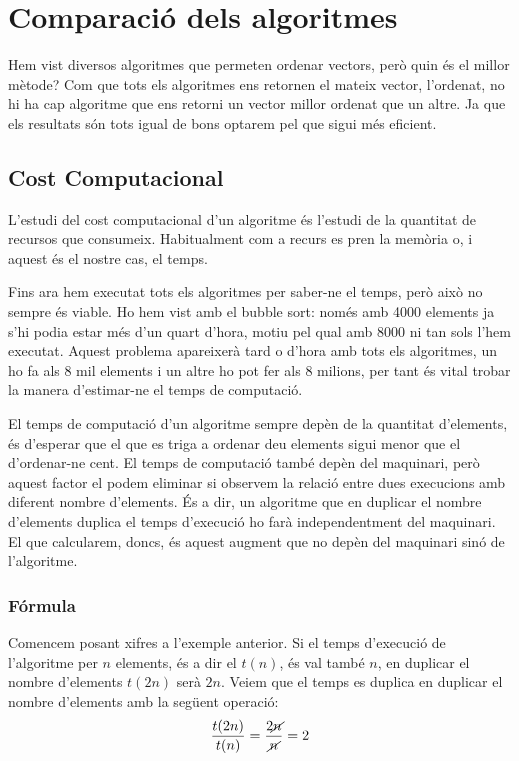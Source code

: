\chapter{Comparació dels algoritmes}
Hem vist diversos algoritmes que permeten ordenar vectors, però quin és el millor mètode?
Com que tots els algoritmes ens retornen el mateix vector, l'ordenat, no hi ha cap algoritme que ens retorni un vector millor ordenat que un altre. Ja que els resultats són tots igual de bons optarem pel que sigui més eficient.

\section{Cost Computacional}
L'estudi del cost computacional d'un algoritme és l'estudi de la quantitat de recursos que consumeix. Habitualment com a recurs es pren la memòria o, i aquest és el nostre cas, el temps.

Fins ara hem executat tots els algoritmes per saber-ne el temps, però això no sempre és viable.
Ho hem vist amb el bubble sort: només amb 4000 elements ja s'hi podia estar més d'un quart d'hora, motiu pel qual amb 8000 ni tan sols l'hem executat.
Aquest problema apareixerà tard o d'hora amb tots els algoritmes, un ho fa als 8 mil elements i un altre ho pot fer als 8 milions, per tant és vital trobar la manera d'estimar-ne el temps de computació.

El temps de computació d'un algoritme sempre depèn de la quantitat d'elements, és d'esperar que el que es triga a ordenar deu elements sigui menor que el d'ordenar-ne cent.
El temps de computació també depèn del maquinari, però aquest factor el podem eliminar si observem la relació entre dues execucions amb diferent nombre d'elements.
És a dir, un algoritme que en duplicar el nombre d'elements duplica el temps d'execució ho farà independentment del maquinari.
El que calcularem, doncs, és aquest augment que no depèn del maquinari sinó de l'algoritme.

\subsection{Fórmula}
Comencem posant xifres a l'exemple anterior.
Si el temps d'execució de l'algoritme per $n$ elements, és a dir el $t(n)$, és val també $n$, en duplicar el nombre d'elements $t(2n)$ serà $2n$.
Veiem que el temps es duplica en duplicar el nombre d'elements amb la següent operació:
\begin{gather*}
	\frac{t(2n)}{t(n)} = \frac{2 \cancel{n}}{ \cancel{n}} = 2
\end{gather*}

